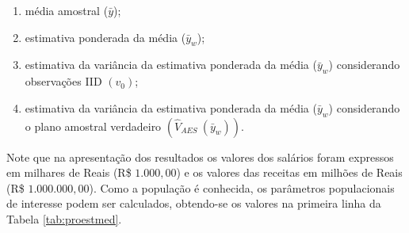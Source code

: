 \documentclass[]{book}
\theoremstyle{definition}
\theoremstyle{definition}
\theoremstyle{definition}
\theoremstyle{remark}
\begin{document}
\begin{enumerate}
\def\labelenumi{\arabic{enumi}.}
\item
  média amostral (\(\bar{y}\));
\item
  estimativa ponderada da média (\(\bar{y}_{w}\));
\item
  estimativa da variância da estimativa ponderada da média
  (\(\bar{y}_{w}\)) considerando observações IID
  \(\left( v_{0}\right)\);
\item
  estimativa da variância da estimativa ponderada da média
  (\(\bar{y}_{w}\)) considerando o plano amostral verdadeiro
  \(\left( \hat{V}_{AES}\ \left( \bar{y}_{w}\right) \right)\).
\end{enumerate}

Note que na apresentação dos resultados os valores dos salários foram
expressos em milhares de Reais (R\$ \(1.000,00\)) e os valores das
receitas em milhões de Reais (R\$ \(1.000.000,00\)). Como a população é
conhecida, os parâmetros populacionais de interesse podem ser
calculados, obtendo-se os valores na primeira linha da Tabela
\ref{tab:proestmed}.
\end{document}
